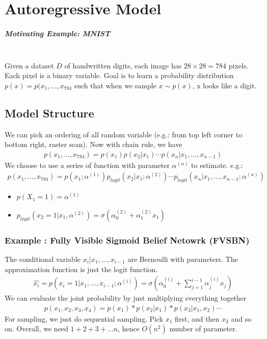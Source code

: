 \chapter{Autoregressive Model}

\paragraph{Motivating Example: MNIST} \mbox{}\\
Given a dataset $D$ of handwritten digits, each image has $28\times 28 = 784$ pixels. Each pixel is a binary variable. Goal is to learn a probability distribution $p(x) = p(x_1,...,x_{784}$ such that when we sample $x\sim p(x)$, x looks like a digit. 

\section{Model Structure}
We can pick an ordering of all random variable (e.g.: from top left corner to bottom right, raster scan). Now with chain rule, we have 
    \begin{align*}
        p(x_1,...,x_{784}) = p(x_1) p(x_2|x_1) \cdots p(x_n|x_1,...,x_{n-1})
    \end{align*}
We choose to use a series of function with parameter $\alpha^{(n)}$ to estimate. e.g.: 
    \begin{align*}
        p(x_1,...,x_{784}) = p(x_1; \alpha^{(1)}) p_{logit}(x_2|x_1; \alpha^{(2)}) \cdots p_{logit}(x_n|x_1,...,x_{n-1}; \alpha^{(n)})
    \end{align*}
    \begin{itemize}
        \item $p(X_1 = 1) =  \alpha^{(1)}$
        \item $p_{logit}(x_2=1|x_1,  \alpha^{(2)}) = \sigma( \alpha_0^{(2)} +  \alpha_1^{(2)}x_1)$
    \end{itemize}
    
    
\subsection{Example : Fully Visible Sigmoid Belief Netowrk (FVSBN)}
The conditional variable $x_i |x_1, ..., x_{i-1}$ are Bernoulli with parameters. The approximation function is just the logit function. 
    \begin{align*}
        \hat{x_i} = p(x_i=1|x_1,...,x_{i-1};\alpha^{(i)}) = \sigma(\alpha_0^{(i)} + \sum_{j=1}^{i-1}\alpha_j^{(i)}x_j)
    \end{align*}
We can evaluate the joint probability by just multiplying everything together
    \begin{align*}
        p(x_1,x_2,x_3,x_4) = p(x_1) * p(x_2|x_1) * p(x_3|x_1,x_2) \cdots
    \end{align*}
For sampling, we just do sequential sampling. Pick $x_1$ first, and then $x_2$ and so on. Overall, we need $1 + 2 + 3 +... n$, hence $O(n^2)$ number of parameter. 

